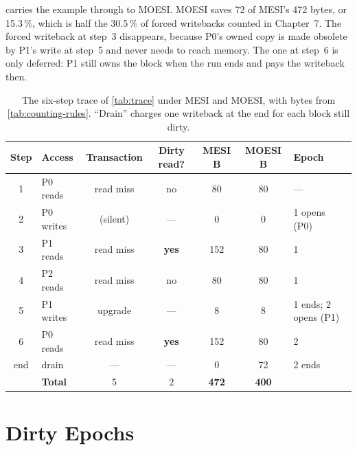  carries the example through to MOESI. MOESI saves 72 of
MESI's 472 bytes, or 15.3\,\%, which is half the 30.5\,\% of forced writebacks
counted in Chapter~7. The forced writeback at step~3 disappears, because P0's owned
copy is made obsolete by P1's write at step~5 and never needs to reach memory. The
one at step~6 is only deferred: P1 still owns the block when the run ends and pays
the writeback then.

\begin{table}[htbp]
\centering
\caption{The six-step trace of \cref{tab:trace} under MESI and MOESI, with bytes
from \cref{tab:counting-rules}. ``Drain'' charges one writeback at the end for
each block still dirty.}
\label{tab:dsr-example}
\small
\begin{tabular}{@{}c l c c c c l@{}}
\toprule
Step & Access & Transaction & Dirty read? & MESI B & MOESI B & Epoch \\
\midrule
1 & P0 reads  & read miss & no  & 80  & 80 & --- \\
2 & P0 writes & (silent)  & --- & 0   & 0  & 1 opens (P0) \\
3 & P1 reads  & read miss & \textbf{yes} & 152 & 80 & 1 \\
4 & P2 reads  & read miss & no  & 80  & 80 & 1 \\
5 & P1 writes & upgrade   & --- & 8   & 8  & 1 ends; 2 opens (P1) \\
6 & P0 reads  & read miss & \textbf{yes} & 152 & 80 & 2 \\
end & drain   & ---       & --- & 0   & 72 & 2 ends \\
\midrule
 & \textbf{Total} & 5 & 2 & \textbf{472} & \textbf{400} & \\
\bottomrule
\end{tabular}
\end{table}

\section{Dirty Epochs}
\label{sec:dsr-epochs}
%

